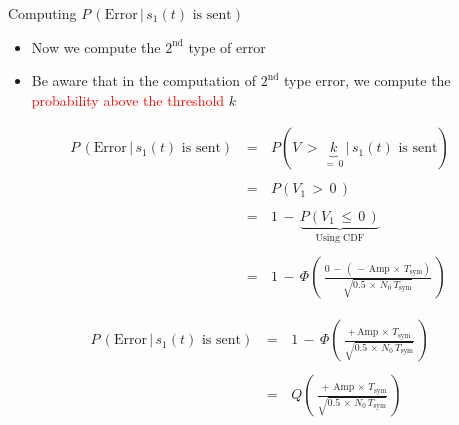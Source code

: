\documentclass{Beamer}
\begin{document}
\begin{frame}[t,allowframebreaks]{Computing $P \, (\text{Error} \, | \, s_1(t) \text{ is sent})$}

\begin{itemize}
\item Now we compute the $\mathrm{2}^{\mathrm{nd}}$ type of error

\item Be aware that in the computation of $\mathrm{2}^{\mathrm{nd}}$ type error, we compute the  \textcolor{red}{probability above the threshold} $k$

\end{itemize}

\begin{equation*}
\begin{array}{rcl}
P \, (\text{Error} \, | \, s_1(t) \text{ is sent}) \, &=& \, P (V \, > \, \underbrace{k}_{ = \, 0} \, | \, s_1(t) \text{ is sent})  \\ \\ 
	&=&  \, P (V_1 \, >  \, 0 \,) \\ \\
	&=&  \, 1 \, - \, \underbrace{P (V_1 \, \leq \, 0 \,)}_{\text{Using CDF}} \\ \\
	&=&  \, 1 \, - \, \Phi \left(\, \displaystyle\frac{0  \, - \, (\, - \, \text{Amp} \, \times \, T_{\text{sym}})}{\sqrt{0.5 \, \times \, N_0 \, T_{\text{sym}}} } \, \right)
\end{array}
\end{equation*}

\newpage

\begin{equation*}
\begin{array}{rcl}
P \, (\text{Error} \, | \, s_1(t) \text{ is sent}) \, &=&  \, 1 \, - \, \Phi \left(\, \displaystyle\frac{+ \, \text{Amp} \, \times \, T_{\text{sym}}}{\sqrt{0.5 \, \times \, N_0 \, T_{\text{sym}}} } \, \right) \\ \\
&=&  \, Q \left(\, \displaystyle\frac{ \, + \, \text{Amp} \, \times \, T_{\text{sym}}}{\sqrt{0.5 \, \times \, N_0 \, T_{\text{sym}}} } \, \right)
\end{array}
\end{equation*}


\end{frame}
\end{document}
